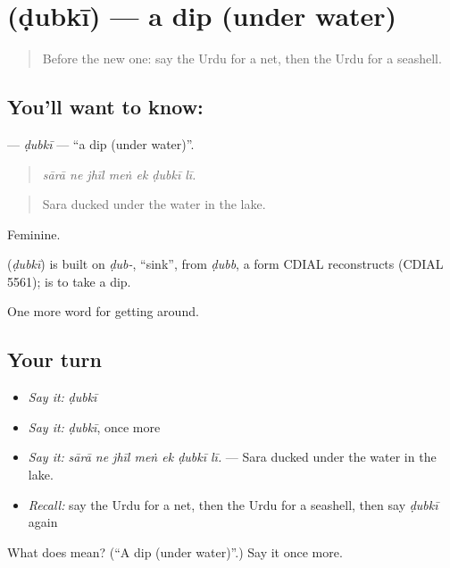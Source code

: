\section[\texorpdfstring{\ur{ڈبکی} (ḍubkī)}{ڈبکی (ḍubkī)}]{ (ḍubkī) — a dip (under water)}

\label{lesson:UR-C435-dubki}



\begin{quote}
Before the new one: say the Urdu for a net, then the Urdu for a seashell.
\end{quote}

\subsection*{You'll want to know: }
\textbf{} — \emph{ḍubkī} — \textquotedblleft{}a dip (under water)\textquotedblright{}.

\begin{quote}
      
\end{quote}

\begin{quote}
\emph{sārā ne jhīl meṅ ek ḍubkī lī.}
\end{quote}

\begin{quote}
Sara ducked under the water in the lake.
\end{quote}

Feminine.

\begin{cousinweb}
\textbf{} (\emph{ḍubkī}) is built on \emph{ḍub-}, \textquotedblleft{}sink\textquotedblright{}, from \emph{ḍubb}, a form CDIAL reconstructs (CDIAL 5561); \textbf{ } is to take a dip.
\end{cousinweb}

\begin{grammarlens}[title={What you've built}]
One more word for getting around.
\end{grammarlens}

\subsection*{Your turn}
\begin{itemize}
\raggedright
  \item \emph{Say it:} \emph{ḍubkī}
  \item \emph{Say it:} \emph{ḍubkī}, once more
  \item \emph{Say it:} \emph{sārā ne jhīl meṅ ek ḍubkī lī.} — Sara ducked under the water in the lake.
  \item \emph{Recall:} say the Urdu for a net, then the Urdu for a seashell, then say \emph{ḍubkī} again
\end{itemize}

\begin{tcolorbox}[breakable,colback=teal!4,colframe=teal!35!black,title={Before you move on}]
What does  mean? (\textquotedblleft{}A dip (under water)\textquotedblright{}.) Say it once more.
\end{tcolorbox}

